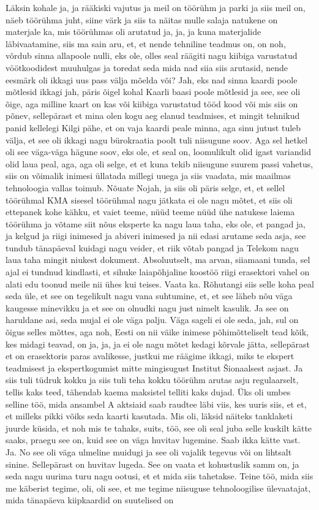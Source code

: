 Läksin kohale ja, ja rääkiski vajutus ja meil on töörühm ja parki ja siis meil on, näeb töörühma juht, siine värk ja siis ta näitas mulle salaja natukene on materjale ka, mis töörühmas oli arutatud ja, ja, ja kuna materjalide läbivaatamine, siis ma sain aru, et, et nende tehniline teadmus on, on noh, võrdub sinna allapoole nulli, eks ole, olles seal räägiti nagu kiibiga varustatud vöötkoodidest muuhulgas ja toredat seda mida nad siia siis arutasid, nende eesmärk oli ikkagi uus pass välja mõelda või? Jah, eks nad sinna kaardi poole mõtlesid ikkagi jah, päris õigel kohal Kaarli baasi poole mõtlesid ja see, see oli õige, aga milline kaart on kas või kiibiga varustatud tööd kood või mis siis on põnev, sellepärast et mina olen kogu aeg elanud teadmises, et mingit tehnikud panid kellelegi Kilgi pähe, et on vaja kaardi peale minna, aga sinu jutust tuleb välja, et see oli ikkagi nagu bürokraatia poolt tuli niisugune soov. Aga sel hetkel oli see väga-väga hägune soov, eks ole, et seal on, loomulikult olid igast variandid olid laua peal, aga, aga oli selge, et et kuna tekib niisugune suurem passi vahetus, siis on võimalik inimesi üllatada millegi uuega ja siis vaadata, mis maailmas tehnoloogia vallas toimub. Nõuate Nojah, ja siis oli päris selge, et, et sellel töörühmal KMA sisesel töörühmal nagu jätkata ei ole nagu mõtet, et siis oli ettepanek kohe kähku, et vaiet teeme, nüüd teeme nüüd ühe natukese laiema töörühma ja võtame siit nõus eksperte ka nagu laua taha, eks ole, et pangad ja, ja kelgud ja riigi inimesed ja abiveri inimesed ja nii edasi arutame seda asja, see tundub tänapäeval kuidagi nagu veider, et riik võtab pangad ja Telekom nagu laua taha mingit niukest dokument. Absoluutselt, ma arvan, siiamaani tunda, sel ajal ei tundnud kindlasti, et sihuke laiapõhjaline koostöö riigi erasektori vahel on alati edu toonud meile nii ühes kui teises. Vaata ka. Rõhutangi siis selle koha peal seda üle, et see on tegelikult nagu vana suhtumine, et, et see läheb nõu väga kaugesse minevikku ja et see on olnudki nagu just nimelt kasulik. Ja see on haruldane asi, seda mujal ei ole väga palju. Väga sageli ei ole seda, jah, sul on õigus selles mõttes, aga noh, Eesti on nii väike inimese põhimõtteliselt tead kõik, kes midagi teavad, on ja, ja, ja ei ole nagu mõtet kedagi kõrvale jätta, sellepärast et on erasektoris paras avalikesse, justkui me räägime ikkagi, miks te ekspert teadmisest ja ekspertkogumist mitte mingisugust Institut Šionaalsest asjast. Ja siis tuli tüdruk kokku ja siis tuli teha kokku töörühm arutas asju regulaarselt, tellis kaks teed, tähendab kaema maksistel telliti kaks dujad. Üks oli umbes selline töö, mida ansambel A aktsiaid saab raudtee läbi viis, kes uuris siis, et et, et milleks pikki võiks seda kaarti kasutada. Mis oli, läksid näiteks tanklaketi juurde küsida, et noh mis te tahaks, suits, töö, see oli seal juba selle kuskilt kätte saaks, praegu see on, kuid see on väga huvitav lugemine. Saab ikka kätte vast. Ja. No see oli väga ulmeline muidugi ja see oli vajalik tegevus või on lihtsalt sinine. Sellepärast on huvitav lugeda. See on vaata et kohustuslik samm on, ja seda nagu uurima turu nagu ootusi, et et mida siis tahetakse. Teine töö, mida siis me käberist tegime, oli, oli see, et me tegime niisuguse tehnoloogilise ülevaatajat, mida tänapäeva kiipkaardid on suutelised on 